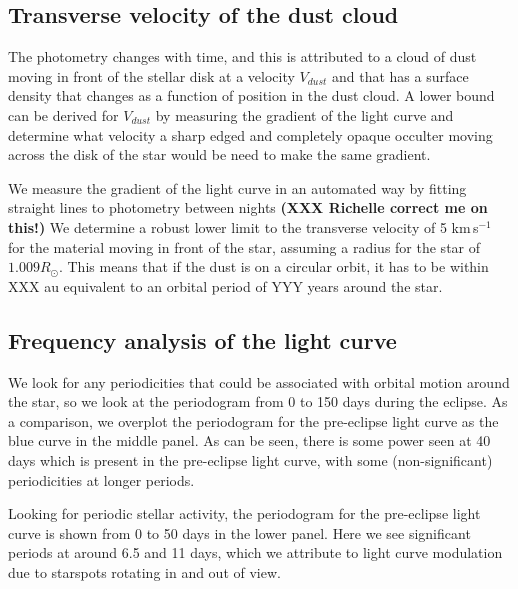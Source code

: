 \documentclass{aa}
\begin{document}
\subsection{Transverse velocity of the dust cloud}

The photometry changes with time, and this is attributed to a cloud of dust moving in front of the stellar disk at a velocity $V_{dust}$ and that has a surface density that changes as a function of position in the dust cloud.
%
A lower bound can be derived for $V_{dust}$ by measuring the gradient of the light curve and determine what velocity a sharp edged and completely opaque occulter moving across the disk of the star would be need to make the same gradient.

We measure the gradient of the light curve in an automated way by fitting straight lines to photometry between nights {\bf (XXX Richelle correct me on this!)}
%
We determine a robust lower limit to the transverse velocity of 5 km\,s$^{-1}$ for the material moving in front of the star, assuming a radius for the star of $1.009 R_\odot$.
%
This means that if the dust is on a circular orbit, it has to be within XXX au equivalent to an orbital period of YYY years around the star.

\subsection{Frequency analysis of the light curve}

%
%
We look for any periodicities that could be associated with orbital motion around the star, so we look at the periodogram from 0 to 150 days during the eclipse.
%
As a comparison, we overplot the periodogram for the pre-eclipse light curve as the blue curve in the middle panel. 
%
As can be seen, there is some power seen at 40 days which is present in the pre-eclipse light curve, with some (non-significant) periodicities at longer periods.

Looking for periodic stellar activity, the periodogram for the pre-eclipse light curve is shown from 0 to 50 days in the lower panel.
%
Here we see significant periods at around 6.5 and 11 days, which we attribute to light curve modulation due to starspots rotating in and out of view. 
\end{document}
